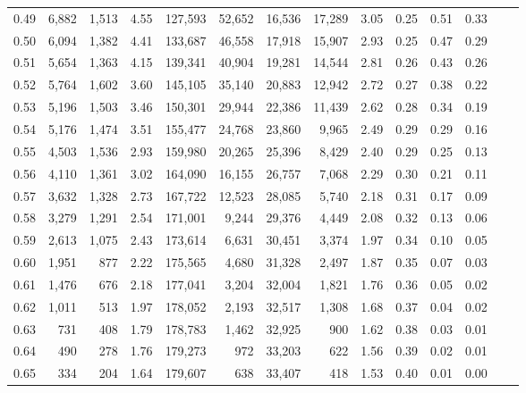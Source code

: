 \begin{tabular}{rrrrrrrrrrrrrr}
0.49 &  6,882 &  1,513 &    4.55 &  127,593 &   52,652 &  16,536 &  17,289 &  3.05 &  0.25 &  0.51 &      0.33 \\
0.50 &  6,094 &  1,382 &    4.41 &  133,687 &   46,558 &  17,918 &  15,907 &  2.93 &  0.25 &  0.47 &      0.29 \\
0.51 &  5,654 &  1,363 &    4.15 &  139,341 &   40,904 &  19,281 &  14,544 &  2.81 &  0.26 &  0.43 &      0.26 \\
0.52 &  5,764 &  1,602 &    3.60 &  145,105 &   35,140 &  20,883 &  12,942 &  2.72 &  0.27 &  0.38 &      0.22 \\
0.53 &  5,196 &  1,503 &    3.46 &  150,301 &   29,944 &  22,386 &  11,439 &  2.62 &  0.28 &  0.34 &      0.19 \\
0.54 &  5,176 &  1,474 &    3.51 &  155,477 &   24,768 &  23,860 &   9,965 &  2.49 &  0.29 &  0.29 &      0.16 \\
0.55 &  4,503 &  1,536 &    2.93 &  159,980 &   20,265 &  25,396 &   8,429 &  2.40 &  0.29 &  0.25 &      0.13 \\
0.56 &  4,110 &  1,361 &    3.02 &  164,090 &   16,155 &  26,757 &   7,068 &  2.29 &  0.30 &  0.21 &      0.11 \\
0.57 &  3,632 &  1,328 &    2.73 &  167,722 &   12,523 &  28,085 &   5,740 &  2.18 &  0.31 &  0.17 &      0.09 \\
0.58 &  3,279 &  1,291 &    2.54 &  171,001 &    9,244 &  29,376 &   4,449 &  2.08 &  0.32 &  0.13 &      0.06 \\
0.59 &  2,613 &  1,075 &    2.43 &  173,614 &    6,631 &  30,451 &   3,374 &  1.97 &  0.34 &  0.10 &      0.05 \\
0.60 &  1,951 &    877 &    2.22 &  175,565 &    4,680 &  31,328 &   2,497 &  1.87 &  0.35 &  0.07 &      0.03 \\
0.61 &  1,476 &    676 &    2.18 &  177,041 &    3,204 &  32,004 &   1,821 &  1.76 &  0.36 &  0.05 &      0.02 \\
0.62 &  1,011 &    513 &    1.97 &  178,052 &    2,193 &  32,517 &   1,308 &  1.68 &  0.37 &  0.04 &      0.02 \\
0.63 &    731 &    408 &    1.79 &  178,783 &    1,462 &  32,925 &     900 &  1.62 &  0.38 &  0.03 &      0.01 \\
0.64 &    490 &    278 &    1.76 &  179,273 &      972 &  33,203 &     622 &  1.56 &  0.39 &  0.02 &      0.01 \\
0.65 &    334 &    204 &    1.64 &  179,607 &      638 &  33,407 &     418 &  1.53 &  0.40 &  0.01 &      0.00 \\

\end{tabular}
